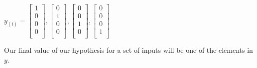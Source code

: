 \documentclass{article}
\begin{document}
$
y_{(i)}=
\left[\begin{matrix}
1 \\
0 \\
0 \\
0 \\
\end{matrix}\right],
\left[\begin{matrix}
0 \\
1 \\
0 \\
0 \\
\end{matrix}\right],
\left[\begin{matrix}
0 \\
0 \\
1 \\
0 \\
\end{matrix}\right],
\left[\begin{matrix}
0 \\
0 \\
0 \\
1 \\
\end{matrix}\right]
$

Our final value of our hypothesis for a set of inputs will be one of the elements in $y$.
\end{document}
